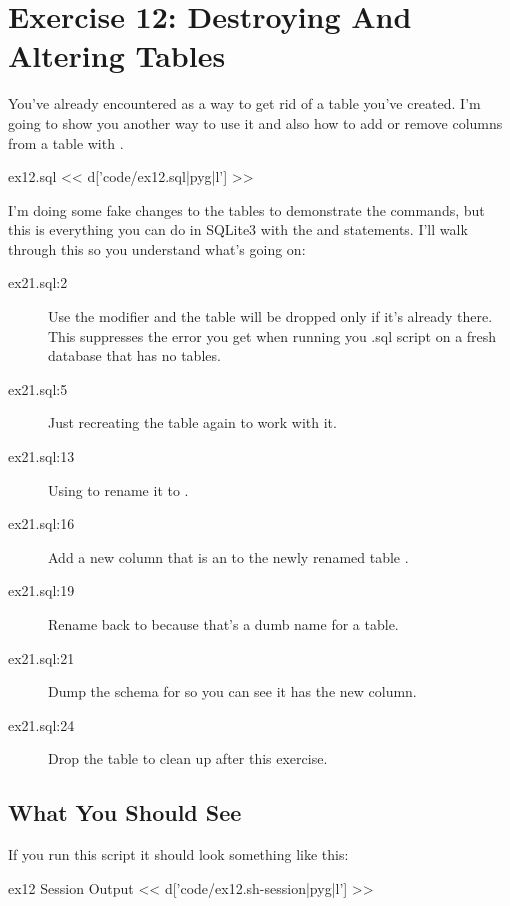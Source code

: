 \chapter{Exercise 12: Destroying And Altering Tables}

You've already encountered  as a way to get rid of
a table you've created.  I'm going to show you another way to use it
and also how to add or remove columns from a table with .

\begin{code}{ex12.sql}
<< d['code/ex12.sql|pyg|l'] >>
\end{code}

I'm doing some fake changes to the tables to demonstrate the commands, but
this is everything you can do in SQLite3 with the  and
 statements.  I'll walk through this so you understand
what's going on:

\begin{description}
\item[ex21.sql:2] Use the  modifier and the table will be dropped
    only if it's already there.  This suppresses the error you get when
    running you .sql script on a fresh database that has no tables.
\item[ex21.sql:5] Just recreating the table again to work with it.
\item[ex21.sql:13] Using  to rename it to .
\item[ex21.sql:16] Add a new column  that is an  to
    the newly renamed table .
\item[ex21.sql:19] Rename  back to  because that's
    a dumb name for a table.
\item[ex21.sql:21] Dump the schema for  so you can see it has the
    new  column.
\item[ex21.sql:24] Drop the table to clean up after this exercise.
\end{description}

\section{What You Should See}

If you run this script it should look something like this:

\begin{code}{ex12 Session Output}
<< d['code/ex12.sh-session|pyg|l'] >>
\end{code}

